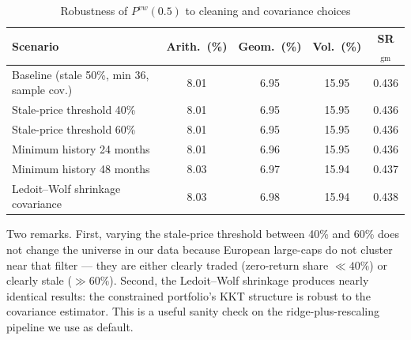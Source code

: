 \documentclass[11pt,a4paper]{article}
\begin{document}
\begin{table}[H]
\centering
\caption{Robustness of $P^{vw}(0.5)$ to cleaning and covariance
choices}\label{tab:robustness}
\small
\begin{tabular}{l S[table-format=2.2] S[table-format=2.2] S[table-format=2.2] S[table-format=1.3]}
\toprule
Scenario                                       & {Arith.\ (\%)} & {Geom.\ (\%)} & {Vol.\ (\%)} & {SR$_{\text{gm}}$} \\
\midrule
Baseline (stale 50\%, min 36, sample cov.)     & 8.01           & 6.95          & 15.95        & 0.436              \\
Stale-price threshold 40\%                     & 8.01           & 6.95          & 15.95        & 0.436              \\
Stale-price threshold 60\%                     & 8.01           & 6.95          & 15.95        & 0.436              \\
Minimum history 24 months                      & 8.01           & 6.96          & 15.95        & 0.436              \\
Minimum history 48 months                      & 8.03           & 6.97          & 15.94        & 0.437              \\
Ledoit--Wolf shrinkage covariance              & 8.03           & 6.98          & 15.94        & 0.438              \\
\bottomrule
\end{tabular}
\end{table}


Two remarks. First, varying the stale-price threshold between 40\% and
60\% does not change the universe in our data because European
large-caps do not cluster near that filter --- they are either
clearly traded (zero-return share $\ll 40\%$) or clearly stale
($\gg 60\%$). Second, the Ledoit--Wolf shrinkage produces nearly
identical results: the constrained portfolio's KKT structure is
robust to the covariance estimator. This is a useful sanity check on
the ridge-plus-rescaling pipeline we use as default.
\end{document}

